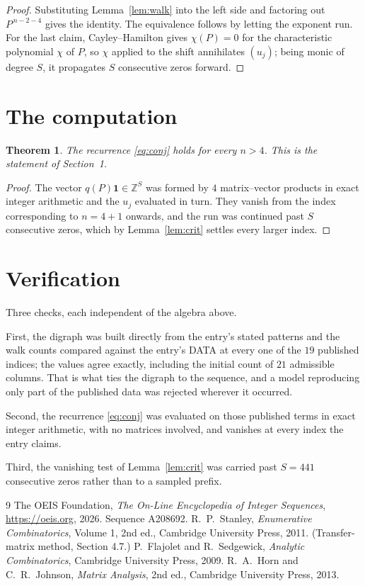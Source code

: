 \documentclass[11pt,a4paper]{article}
\theoremstyle{plain}
\newtheorem{theorem}{Theorem}
\theoremstyle{definition}
\begin{document}
\begin{proof}
Substituting Lemma~\ref{lem:walk} into the left side and factoring out
$P^{\,n-2-4}$ gives the identity. The equivalence follows by letting the exponent
run. For the last claim, Cayley--Hamilton gives $\chi(P)=0$ for the characteristic
polynomial $\chi$ of $P$, so $\chi$ applied to the shift annihilates $(u_j)$; being monic of
degree $S$, it propagates $S$ consecutive zeros forward.
\end{proof}

\section{The computation}

\begin{theorem}
The recurrence \eqref{eq:conj} holds for every $n>4$. This is the statement of
Section~1.
\end{theorem}

\begin{proof}
The vector $q(P)\mathbf{1}\in\mathbb{Z}^{S}$ was formed by $4$ matrix--vector
products in exact integer arithmetic and the $u_j$ evaluated in turn. They vanish from the
index corresponding to $n=4+1$ onwards, and the run was continued past $S$ consecutive
zeros, which by Lemma~\ref{lem:crit} settles every larger index.
\end{proof}

\section{Verification}

Three checks, each independent of the algebra above.

First, the digraph was built directly from the entry's stated patterns and the walk counts
compared against the entry's DATA at every one of the $19$ published indices; the
values agree exactly, including the initial count of $21$ admissible columns. That is
what ties the digraph to the sequence, and a model reproducing only part of the published
data was rejected wherever it occurred.

Second, the recurrence \eqref{eq:conj} was evaluated on those published terms in exact
integer arithmetic, with no matrices involved, and vanishes at every index the entry claims.

Third, the vanishing test of Lemma~\ref{lem:crit} was carried past $S=441$ consecutive
zeros rather than to a sampled prefix.

\begin{thebibliography}{9}
 The OEIS Foundation, \emph{The On-Line Encyclopedia of Integer
Sequences}, \url{https://oeis.org}, 2026. Sequence A208692.
 R.~P.~Stanley, \emph{Enumerative Combinatorics}, Volume 1, 2nd ed.,
Cambridge University Press, 2011. (Transfer-matrix method, Section 4.7.)
 P.~Flajolet and R.~Sedgewick, \emph{Analytic Combinatorics}, Cambridge
University Press, 2009.
 R.~A.~Horn and C.~R.~Johnson, \emph{Matrix Analysis}, 2nd ed., Cambridge
University Press, 2013.
\end{thebibliography}
\end{document}
